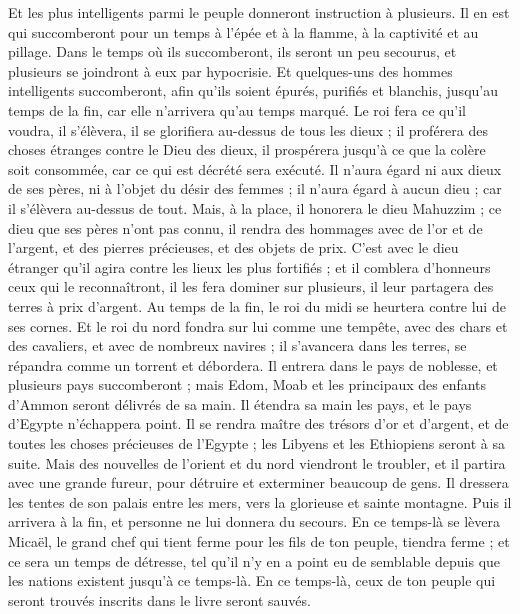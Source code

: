 \begin{multicols}{2}
Et les plus intelligents parmi le peuple donneront instruction à plusieurs. Il en est qui succomberont pour un temps à l'épée et à la flamme, à la captivité et au pillage.
Dans le temps où ils  succomberont, ils seront un peu secourus, et plusieurs se joindront à eux par hypocrisie.
Et quelques-uns des hommes intelligents succomberont, afin qu’ils soient épurés, purifiés et blanchis, jusqu'au temps de la fin, car elle n’arrivera qu’au temps marqué.
Le roi fera ce qu’il voudra, il s’élèvera, il se glorifiera au-dessus de tous les dieux ; il proférera des choses étranges contre le Dieu des dieux, il prospérera jusqu'à ce que la colère soit consommée,  car ce qui est décrété sera exécuté.
Il n’aura égard ni aux dieux de ses pères, ni à l’objet du désir des femmes ; il n’aura égard à aucun dieu ; car il s'élèvera au-dessus de tout.
Mais, à la place, il honorera le dieu Mahuzzim ; ce dieu que ses pères n'ont pas connu, il rendra des hommages avec de l'or et de l'argent, et des pierres précieuses, et des objets de prix.
C’est avec le dieu étranger qu’il agira contre les lieux les plus fortifiés ; et il comblera d’honneurs ceux qui le reconnaîtront, il les fera dominer sur plusieurs, il leur partagera des terres à prix d’argent.
Au temps de la fin, le roi du midi se heurtera contre lui de ses cornes. Et le roi du nord fondra sur lui comme une tempête, avec des chars et des cavaliers, et avec de nombreux navires ; il s’avancera dans les terres, se répandra comme un torrent et débordera.
Il entrera dans le pays de noblesse, et plusieurs pays succomberont ; mais Edom, Moab et les principaux des enfants d’Ammon seront délivrés de sa main.
Il étendra sa main les pays, et le pays d'Egypte n'échappera point.
Il se rendra maître des trésors d'or et d'argent, et de toutes les choses précieuses de l'Egypte ; les Libyens et les Ethiopiens seront à sa suite.
Mais des nouvelles de l'orient et du nord viendront le troubler, et il partira avec une grande fureur, pour détruire et exterminer beaucoup de gens.
Il dressera les tentes de son palais entre les mers, vers la glorieuse et sainte montagne. Puis il arrivera à la fin, et personne ne lui donnera du secours.
\VerseOne{}En ce temps-là se lèvera Micaël, le grand chef qui tient ferme pour les fils de ton peuple, tiendra ferme ; et ce sera un temps de détresse, tel qu'il n'y en a point eu de semblable depuis que les nations existent jusqu’à ce temps-là. En ce temps-là, ceux de ton peuple qui seront trouvés inscrits dans le livre seront sauvés.

\end{multicols}
